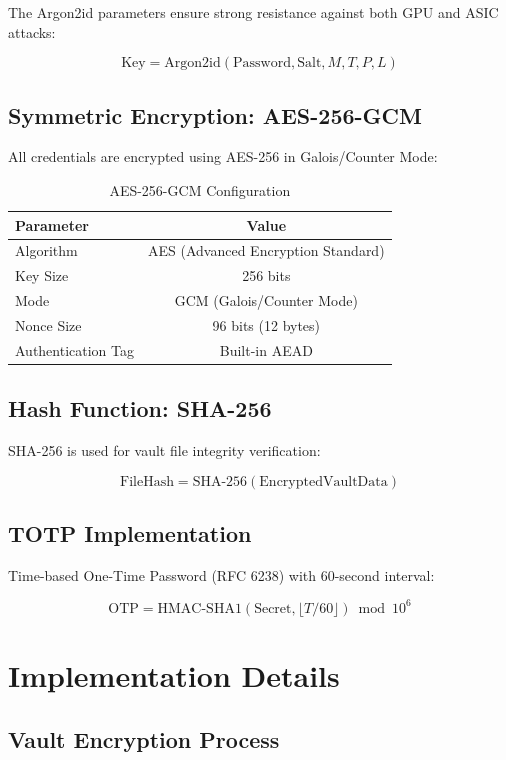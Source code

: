 \documentclass[12pt,a4paper]{report}
\begin{document}
The Argon2id parameters ensure strong resistance against both GPU and ASIC attacks:

\[
\text{Key} = \text{Argon2id}(\text{Password}, \text{Salt}, M, T, P, L)
\]

\subsection{Symmetric Encryption: AES-256-GCM}

All credentials are encrypted using AES-256 in Galois/Counter Mode:

\begin{table}[H]
\centering
\begin{tabular}{|l|c|}
\hline
\textbf{Parameter} & \textbf{Value} \\
\hline
Algorithm & AES (Advanced Encryption Standard) \\
Key Size & 256 bits \\
Mode & GCM (Galois/Counter Mode) \\
Nonce Size & 96 bits (12 bytes) \\
Authentication Tag & Built-in AEAD \\
\hline
\end{tabular}
\caption{AES-256-GCM Configuration}
\end{table}

\subsection{Hash Function: SHA-256}

SHA-256 is used for vault file integrity verification:

\[
\text{FileHash} = \text{SHA-256}(\text{EncryptedVaultData})
\]

\subsection{TOTP Implementation}

Time-based One-Time Password (RFC 6238) with 60-second interval:

\[
\text{OTP} = \text{HMAC-SHA1}(\text{Secret}, \lfloor T/60 \rfloor) \bmod 10^6
\]

\section{Implementation Details}

\subsection{Vault Encryption Process}
\end{document}
